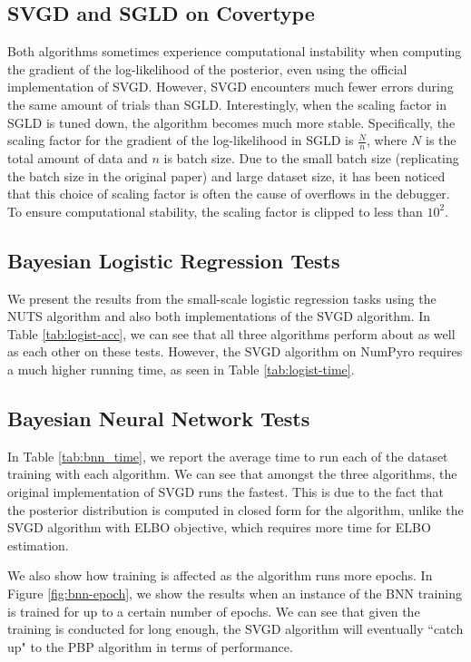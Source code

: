 \subsection{SVGD and SGLD on Covertype}
Both algorithms sometimes experience computational instability when computing the gradient of the log-likelihood of the posterior, even using the official implementation of SVGD. However, SVGD encounters much fewer errors during the same amount of trials than SGLD. Interestingly, when the scaling factor in SGLD is tuned down, the algorithm becomes much more stable. Specifically, the scaling factor for the gradient of the log-likelihood in SGLD is $\frac{N}{n}$, where $N$ is the total amount of data and $n$ is batch size. Due to the small batch size (replicating the batch size in the original paper) and large dataset size, it has been noticed that this choice of scaling factor is often the cause of overflows in the debugger. To ensure computational stability, the scaling factor is clipped to less than $10^2$.

\subsection{Bayesian Logistic Regression Tests}\label{ssect:bylog-data}

We present the results from the small-scale logistic regression tasks using the NUTS algorithm and also both implementations of the SVGD algorithm. In Table \ref{tab:logist-acc}, we can see that all three algorithms perform about as well as each other on these tests. However, the SVGD algorithm on NumPyro requires a much higher running time, as seen in Table \ref{tab:logist-time}. 



\subsection{Bayesian Neural Network Tests}\label{ssect:bnn-time}

In Table \ref{tab:bnn_time}, we report the average time to run each of the dataset training with each algorithm. We can see that amongst the three algorithms, the original implementation of SVGD runs the fastest. This is due to the fact that the posterior distribution is computed in closed form for the algorithm, unlike the SVGD algorithm with ELBO objective, which requires more time for ELBO estimation.



\label{ssect:bnn-epoch}

We also show how training is affected as the algorithm runs more epochs. In Figure \ref{fig:bnn-epoch}, we show the results when an instance of the BNN training is trained for up to a certain number of epochs. We can see that given the training is conducted for long enough, the SVGD algorithm will eventually ``catch up" to the PBP algorithm in terms of performance.

